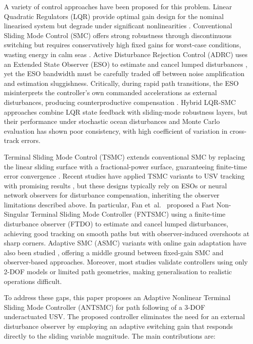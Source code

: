 \documentclass[review]{cas-dc}
\begin{document}
A variety of control approaches have been proposed for this problem. Linear Quadratic Regulators (LQR) provide optimal gain design for the nominal linearised system but degrade under significant nonlinearities \citep{Anderson1990}. Conventional Sliding Mode Control (SMC) offers strong robustness through discontinuous switching but requires conservatively high fixed gains for worst-case conditions, wasting energy in calm seas \citep{Utkin2009,Ashrafiuon2008}. Active Disturbance Rejection Control (ADRC) uses an Extended State Observer (ESO) to estimate and cancel lumped disturbances \citep{Gao2003,Herbst2013}, yet the ESO bandwidth must be carefully traded off between noise amplification and estimation sluggishness. Critically, during rapid path transitions, the ESO misinterprets the controller's own commanded accelerations as external disturbances, producing counterproductive compensation \citep{Liu2023}. Hybrid LQR-SMC approaches combine LQR state feedback with sliding-mode robustness layers, but their performance under stochastic ocean disturbances and Monte Carlo evaluation has shown poor consistency, with high coefficient of variation in cross-track errors.

Terminal Sliding Mode Control (TSMC) extends conventional SMC by replacing the linear sliding surface with a fractional-power surface, guaranteeing finite-time error convergence \citep{Venkataraman1991,Yu2002}. Recent studies have applied TSMC variants to USV tracking with promising results \citep{Fan2021,Wu2023,Zhang2024}, but these designs typically rely on ESOs or neural network observers for disturbance compensation, inheriting the observer limitations described above. In particular, Fan et~al.\ \citep{Fan2021} proposed a Fast Non-Singular Terminal Sliding Mode Controller (FNTSMC) using a finite-time disturbance observer (FTDO) to estimate and cancel lumped disturbances, achieving good tracking on smooth paths but with observer-induced overshoots at sharp corners. Adaptive SMC (ASMC) variants with online gain adaptation have also been studied \citep{Yu2012,Elmokadem2017}, offering a middle ground between fixed-gain SMC and observer-based approaches. Moreover, most studies validate controllers using only 2-DOF models or limited path geometries, making generalisation to realistic operations difficult.

To address these gaps, this paper proposes an Adaptive Nonlinear Terminal Sliding Mode Controller (ANTSMC) for path following of a 3-DOF underactuated USV. The proposed controller eliminates the need for an external disturbance observer by employing an adaptive switching gain that responds directly to the sliding variable magnitude. The main contributions are:
\end{document}
